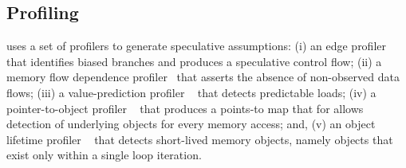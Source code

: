 %
%
%
%
%
%
%
%
%
%

\subsection{Profiling}

\name uses a set of profilers to generate speculative assumptions:
%
(i) an edge profiler~\cite{LLVM:CGO04} that identifies biased
branches and produces a speculative control flow;
%
(ii) a memory flow dependence profiler~\cite{chen:04:cc} that asserts
the absence of non-observed data flows;
%
(iii) a value-prediction profiler ~\cite{gabbay:97:micro} that detects predictable loads;
%
(iv) a pointer-to-object profiler ~\cite{johnson:12:pldi}
that produces a points-to map that for allows detection of underlying objects
for every memory access; and,
%
(v) an object lifetime profiler ~\cite{johnson:12:pldi}
that detects short-lived memory objects, namely objects that exist only within a
single loop iteration.
%

